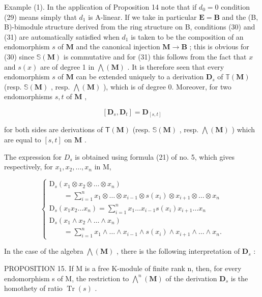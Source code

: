 Example (1). In the application of Proposition 14 note that if \(d_0 = 0\) condition (29) means simply that \(d_1\) is A-linear. If we take in particular \(\mathbf{E} = \mathbf{B}\) and the (B, B)-bimodule structure derived from the ring structure on B, conditions (30) and (31) are automatically satisfied when \(d_1\) is taken to be the composition of an endomorphism \(s\) of \(\mathbf{M}\) and the canonical injection \(\mathbf{M} \to \mathbf{B}\) ; this is obvious for (30) since \(\mathbb{S}(\mathbf{M})\) is commutative and for (31) this follows from the fact that \(x\) and \(s(x)\) are of degree 1 in \(\bigwedge (\mathbf{M})\) . It is therefore seen that every endomorphism \(s\) of \(\mathbf{M}\) can be extended uniquely to a derivation \(\mathbf{D}_s\) of \(\mathbb{T}(\mathbf{M})\) (resp. \(\mathbb{S}(\mathbf{M})\) , resp. \(\bigwedge (\mathbf{M})\) ), which is of degree 0. Moreover, for two endomorphisms \(s, t\) of \(\mathbf{M}\) ,

\[
[ \mathbf {D} _ {s}, \mathbf {D} _ {t} ] = \mathbf {D} _ {[ s, t ]}\tag{35}
\]

for both sides are derivations of \(\mathsf{T}(\mathbf{M})\) (resp. \(\mathbb{S}(\mathbf{M})\) , resp. \(\bigwedge (\mathbf{M})\) ) which are equal to \([s, t]\) on \(\mathbf{M}\) .

The expression for \(D_{s}\) is obtained using formula (21) of no. 5, which gives respectively, for \(x_{1}, x_{2}, \ldots, x_{n}\) in M,

\[
\left\{ \begin{array}{l} \mathrm{D} _ {s} (x _ {1} \otimes x _ {2} \otimes \dots \otimes x _ {n}) \\ \qquad = \sum_ {i = 1} ^ {n} x _ {1} \otimes \dots \otimes x _ {i - 1} \otimes s (x _ {i}) \otimes x _ {i + 1} \otimes \dots \otimes x _ {n} \\ \mathrm{D} _ {s} (x _ {1} x _ {2} \dots x _ {n}) = \sum_ {i = 1} ^ {n} x _ {1} \dots x _ {i - 1} s (x _ {i}) x _ {i + 1} \dots x _ {n} \\ \mathrm{D} _ {s} (x _ {1} \wedge x _ {2} \wedge \dots \wedge x _ {n}) \\ \qquad = \sum_ {i = 1} ^ {n} x _ {1} \wedge \dots \wedge x _ {i - 1} \wedge s (x _ {i}) \wedge x _ {i + 1} \wedge \dots \wedge x _ {n}. \end{array} \right.\tag{36}
\]

In the case of the algebra \(\bigwedge (\mathbf{M})\) , there is the following interpretation of \(\mathbf{D}_s\) :

PROPOSITION 15. If M is a free K-module of finite rank n, then, for every endomorphism s of M, the restriction to \(\bigwedge^{n}(\mathbf{M})\) of the derivation \(\mathbf{D}_{s}\) is the homothety of ratio \(\operatorname{Tr}(s)\) .

